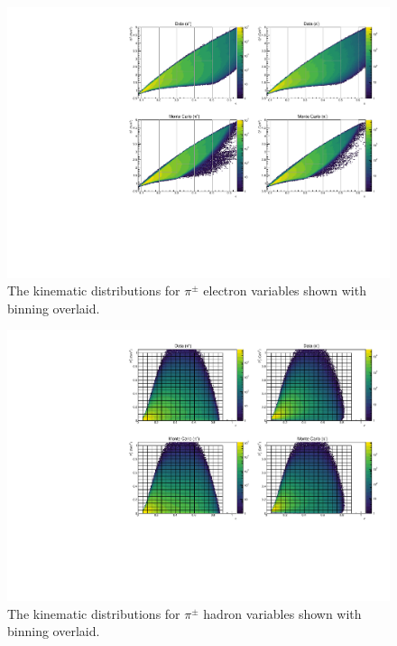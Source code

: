 \begin{figure}
  \centering
  \includegraphics[width=\textwidth]{image/plots/sidis/xq2.pdf}
  \caption[Kinematic distributions and binning for electron variables.]{The kinematic distributions for $\pi^{\pm}$ electron variables shown with binning overlaid.}
  \label{fig:kinematics_xq2}

\end{figure}

\begin{figure}
  \centering
  \includegraphics[width=\textwidth]{image/plots/sidis/zpt.pdf}
  \caption[Kinematic distributions and binning for hadron variables.]{The kinematic distributions for $\pi^{\pm}$ hadron variables shown with binning overlaid.}
    \label{fig:kinematics_zpt}

\end{figure}

